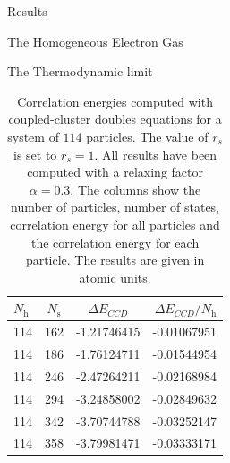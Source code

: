 \documentclass[twoside,english]{uiofysmaster}
\begin{document}
\begin{chapter}{Results}
\begin{section}{The Homogeneous Electron Gas}
\begin{subsection}{The Thermodynamic limit}
			\begin{table}[H]
				\begin{center}
					\begin{tabular}[center]{l  c  c r}
						$N_{\text{h}}$ & $N_{\text{s}}$ & $\Delta E_{CCD}$ & $\Delta E_{CCD}/N_{\text{h}}$ \\
						\hline
						114 & 162 & -1.21746415 & -0.01067951 \\
						114 & 186 & -1.76124711 & -0.01544954 \\
						114 & 246 & -2.47264211 & -0.02168984 \\
						114 & 294 & -3.24858002 & -0.02849632 \\
						114 & 342 & -3.70744788 & -0.03252147 \\
						114 & 358 & -3.79981471 & -0.03333171
					\end{tabular}
				\end{center}
				\caption{Correlation energies computed with coupled-cluster doubles equations for a system of $114$ particles. The value of $r_s$ is set to $r_s=1$. All results have been computed with a relaxing factor $\alpha=0.3$. The columns show the number of particles, number of states, correlation energy for all particles and the correlation energy for each particle. The results are given in atomic units.}
				\label{table:ThermodynamicLimit5}
			\end{table}
		\end{subsection}
	\end{section}


\end{chapter}
\end{document}
